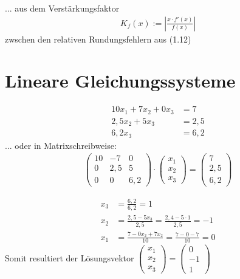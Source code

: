 \documentclass[13pt]{scrreprt}
\newcounter{BoxCounter}
\begin{document}
\begin{tbox}
	... aus dem Verstärkungsfaktor
	\begin{align*}
		K_f(x) := |\frac{x \cdot f'(x)}{f(x)}|
	\end{align*}
	zwschen den relativen Rundungsfehlern aus (1.12)
\end{tbox}

\chapter{Lineare Gleichungssysteme}

\begin{abox}
\end{abox}
\setcounter{BoxCounter}{39}

\begin{tbox}
\begin{align*}
10 x_1 + 7x_2 + 0x_3 &= 7\\
2,5x_2 + 5x_3 &= 2,5\\
6,2x_3 &= 6,2
\end{align*}
... oder in Matrixschreibweise:
\begin{align*}
\begin{pmatrix}
10 & -7 & 0\\
0 & 2,5 & 5\\
0 & 0 & 6,2
\end{pmatrix} \cdot \begin{pmatrix}
x_1 \\ x_2 \\ x_3
\end{pmatrix} = \begin{pmatrix}
7 \\ 2,5 \\ 6,2
\end{pmatrix}
\end{align*}
\end{tbox}

\begin{tbox}
	\begin{align*}
x_3 &= \frac{6,2}{6,2} = 1 \\
x_2 &= \frac{2,5-5x_3}{2,5} = \frac{2,4-5\cdot1}{2,5} = -1\\
x_1 &=  \frac{7-0x_2+7x_2}{10} = \frac{7-0-7}{10} = 0
\end{align*}
Somit resultiert der Lösungsvektor $\begin{pmatrix}
x_1\\x_2\\x_3
\end{pmatrix} = \begin{pmatrix}0\\-1\\1\end{pmatrix}$
\end{tbox}
\end{document}
